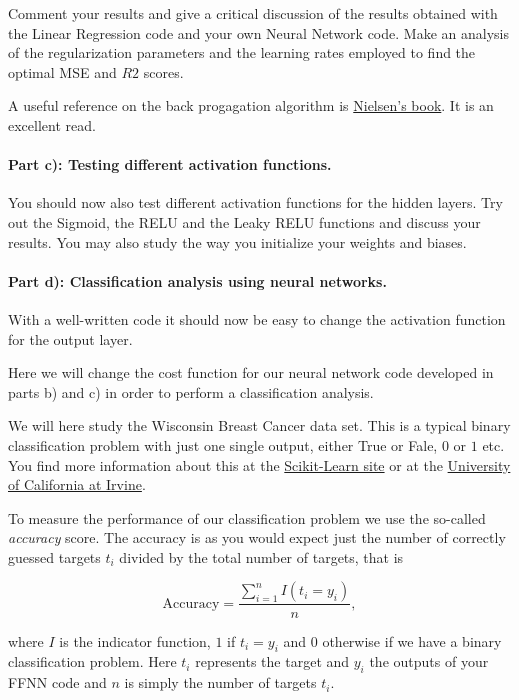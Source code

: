 \documentclass[%
oneside,                 %
final,                   %
10pt]{article}
\begin{document}
Comment your results and give a critical discussion of the results
obtained with the Linear  Regression code and your own Neural Network
code.  
Make an analysis of the regularization parameters and the learning rates employed to find the optimal MSE and $R2$ scores.

A useful reference on the back progagation algorithm is \href{{http://neuralnetworksanddeeplearning.com/}}{Nielsen's
book}. It is an excellent
read.

\paragraph{Part c): Testing different activation functions.}
You should now also test different activation functions for the hidden layers. Try out the Sigmoid, the RELU and the Leaky RELU functions and discuss your results. You may also study the way you initialize your weights and biases.

\paragraph{Part d): Classification  analysis using neural networks.}
With a well-written code it should now be easy to change the
activation function for the output layer.

Here we will change the cost function for our neural network code
developed in parts b) and c) in order to perform a classification analysis. 

We will here study the Wisconsin Breast Cancer  data set. This is a typical binary classification problem with just one single output, either True or Fale, $0$ or $1$ etc.
You find more information about this at the \href{{https://scikit-learn.org/stable/modules/generated/sklearn.datasets.load_breast_cancer.html}}{Scikit-Learn
site} or at the \href{{https://archive.ics.uci.edu/ml/datasets/breast+cancer+wisconsin+(original)}}{University of California
at Irvine}. 

To measure the performance of our classification problem we use the
so-called \emph{accuracy} score.  The accuracy is as you would expect just
the number of correctly guessed targets $t_i$ divided by the total
number of targets, that is 

\[ 
\text{Accuracy} = \frac{\sum_{i=1}^n I(t_i = y_i)}{n} ,
\]

where $I$ is the indicator function, $1$ if $t_i = y_i$ and $0$
otherwise if we have a binary classification problem. Here $t_i$
represents the target and $y_i$ the outputs of your FFNN code and $n$ is simply the number of targets $t_i$.
\end{document}
